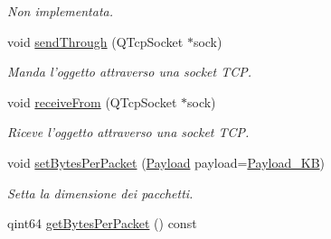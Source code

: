 \begin{DoxyCompactItemize}
\begin{DoxyCompactList}\small\item\em Non implementata. \end{DoxyCompactList}\item 
void \hyperlink{class_k_cloud_1_1_net_object_a06c30b87300c8fa58b587315a049832f}{send\-Through} (Q\-Tcp\-Socket $\ast$sock)
\begin{DoxyCompactList}\small\item\em Manda l'oggetto attraverso una socket T\-C\-P. \end{DoxyCompactList}\item 
void \hyperlink{class_k_cloud_1_1_net_object_a2a788886fd8402e478a56b317a3e86b5}{receive\-From} (Q\-Tcp\-Socket $\ast$sock)
\begin{DoxyCompactList}\small\item\em Riceve l'oggetto attraverso una socket T\-C\-P. \end{DoxyCompactList}\item 
void \hyperlink{class_k_cloud_1_1_net_object_a742b01817e73f6e77b36feff50218d31}{set\-Bytes\-Per\-Packet} (\hyperlink{class_k_cloud_1_1_net_object_a1183d14b184b27ea397cbf2857bc791b}{Payload} payload=\hyperlink{class_k_cloud_1_1_net_object_a1183d14b184b27ea397cbf2857bc791ba21a7b9c1348c682e61c286b7674bc3a8}{Payload\-\_\-K\-B})
\begin{DoxyCompactList}\small\item\em Setta la dimensione dei pacchetti. \end{DoxyCompactList}\item 
qint64 \hyperlink{class_k_cloud_1_1_net_object_a19dc3480af96cad68f0ece7608a53061}{get\-Bytes\-Per\-Packet} () const 
\end{DoxyCompactItemize}
